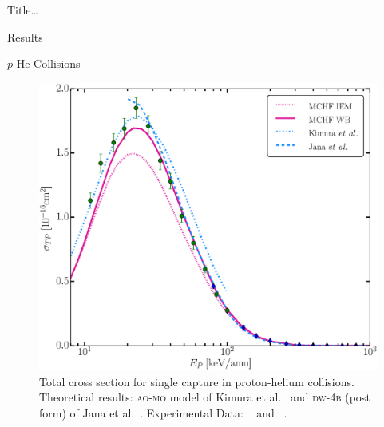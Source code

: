 \documentclass[letterpaper, 10 pt]{report}
\begin{document}
\begin{chapter}{ Title\dots \label{chap:p-he2p-he}}
\begin{section}{Results \label{sec:phe2p-res}}
\begin{subsection}{\texorpdfstring{$p$}{p}-He Collisions \label{sec:phe-res}}
\begin{figure}[ht]
\begin{minipage}{.49\linewidth}
               \centering
               \includegraphics[width = \linewidth]{./images/phe/phe-TP.eps}
               \caption[Total cross section for single capture in proton-helium collisions.]
                       {Total cross section for single capture in proton-helium collisions.
                        Theoretical results: \textsc{ao-mo} model of Kimura et al.~\cite{KL-86} and
                        \textsc{dw-4b} (post form) of Jana et al.~\cite{JMP-15}. Experimental Data:
                        {\color{OliveGreen}{$\bullet$}}~\cite{SG89} and
                        {\color{blue}{$\blacklozenge$}}~\cite{SG85}. \label{fig:phe-tp}}
            \end{minipage} \hspace{0.04\linewidth} %
            \begin{minipage}{.49\linewidth}


\end{minipage}
\end{figure}
\end{subsection}
\end{section}
\end{chapter}
\end{document}
